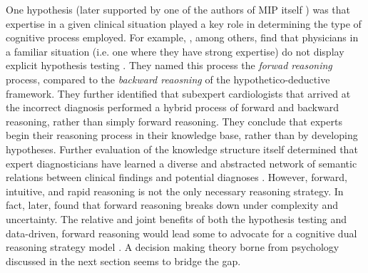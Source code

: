 One hypothesis (later supported by one of the authors of MIP itself \citet{Thinking about diagnostic thinking: a 30-year perspective}) was that expertise in a given clinical situation played a key role in determining the type of cognitive process employed. For example, \citep{Groen G J, Patel V L 1985 Medical problem-solving: some questionable assumptions}, among others, find that physicians in a familiar situation (i.e. one where they have strong expertise) do not display explicit hypothesis testing \citep{eva et al 1998, schmidt et al 1990, brooks et al 1991}. They named this process the \emph{forwad reasoning} process, compared to the \emph{backward reaosning} of the hypothetico-deductive framework. They further identified that subexpert cardiologists that arrived at the incorrect diagnosis performed a hybrid process of forward and backward reasoning, rather than simply forward reasoning. They conclude that experts begin their reasoning process in their knowledge base, rather than by developing hypotheses. Further evaluation of the knowledge structure itself determined that expert diagnosticians have learned a diverse and abstracted network of semantic relations between clinical findings and potential diagnoses \cite{Semantic structures and diagnostic thinking of experts and novices- Bordage, patelKnowledgeBasedSolution1986}. However, forward, intuitive, and rapid reasoning is not the only necessary reasoning strategy. In fact, later, \citet{Patel, V. L., Groen, G. J., & Arocha, J. F. (1990). Medical expertise as a function of task difficulty.MemoryandCognition} found that forward reasoning breaks down under complexity and uncertainty. The relative and joint benefits of both the  hypothesis testing and data-driven, forward reasoning would lead some to advocate for a cognitive dual reasoning strategy model \citep{Eva 2005, Norman 2005}. A decision making theory borne from psychology discussed in the next section seems to bridge the gap.  



